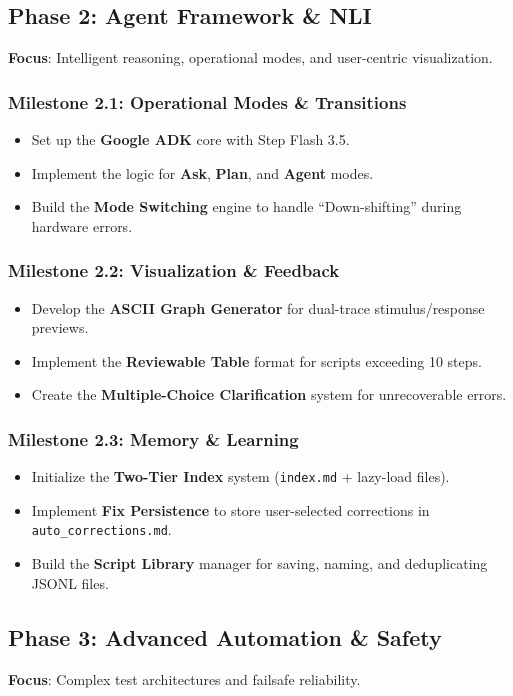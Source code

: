 \documentclass[conference]{IEEEtran}
\begin{document}
\subsection{Phase 2: Agent Framework \& NLI}
\textbf{Focus}: Intelligent reasoning, operational modes, and user-centric visualization.
\subsubsection{Milestone 2.1: Operational Modes \& Transitions}
\begin{itemize}
    \item Set up the \textbf{Google ADK} core with Step Flash 3.5.
    \item Implement the logic for \textbf{Ask}, \textbf{Plan}, and \textbf{Agent} modes.
    \item Build the \textbf{Mode Switching} engine to handle ``Down-shifting'' during hardware errors.
\end{itemize}
\subsubsection{Milestone 2.2: Visualization \& Feedback}
\begin{itemize}
    \item Develop the \textbf{ASCII Graph Generator} for dual-trace stimulus/response previews.
    \item Implement the \textbf{Reviewable Table} format for scripts exceeding 10 steps.
    \item Create the \textbf{Multiple-Choice Clarification} system for unrecoverable errors.
\end{itemize}
\subsubsection{Milestone 2.3: Memory \& Learning}
\begin{itemize}
    \item Initialize the \textbf{Two-Tier Index} system (\texttt{index.md} + lazy-load files).
    \item Implement \textbf{Fix Persistence} to store user-selected corrections in \texttt{auto\_corrections.md}.
    \item Build the \textbf{Script Library} manager for saving, naming, and deduplicating JSONL files.
\end{itemize}

\subsection{Phase 3: Advanced Automation \& Safety}
\textbf{Focus}: Complex test architectures and failsafe reliability.
\end{document}
